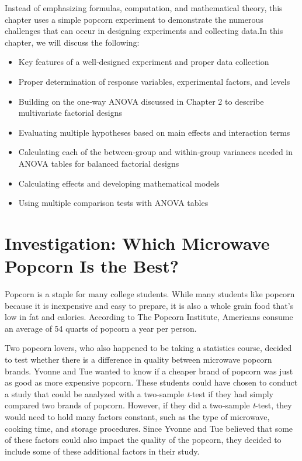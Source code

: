 \documentclass[
]{book}
\providecommand{\tightlist}{%
  \setlength{\itemsep}{0pt}\setlength{\parskip}{0pt}}
\begin{document}
Instead of emphasizing formulas, computation, and mathematical theory, this chapter uses a simple popcorn experiment to demonstrate the numerous challenges that can occur in designing experiments and collecting data.In this chapter, we will discuss the following:

\begin{itemize}
\tightlist
\item
  Key features of a well‑designed experiment and proper data collection
\item
  Proper determination of response variables, experimental factors, and levels\\
\item
  Building on the one‑way ANOVA discussed in Chapter 2 to describe multivariate factorial designs\\
\item
  Evaluating multiple hypotheses based on main effects and interaction terms\\
\item
  Calculating each of the between‑group and within‑group variances needed in ANOVA tables for balanced factorial designs\\
\item
  Calculating effects and developing mathematical models\\
\item
  Using multiple comparison tests with ANOVA tables
\end{itemize}

\newpage

\hypertarget{investigation-which-microwave-popcorn-is-the-best}{%
\section{Investigation: Which Microwave Popcorn Is the Best?}\label{investigation-which-microwave-popcorn-is-the-best}}

Popcorn is a staple for many college students. While many students like popcorn because it is inexpensive and easy to prepare, it is also a whole grain food that's low in fat and calories. According to The Popcorn Institute, Americans consume an average of 54 quarts of popcorn a year per person.

Two popcorn lovers, who also happened to be taking a statistics course, decided to test whether there is a difference in quality between microwave popcorn brands. Yvonne and Tue wanted to know if a cheaper brand of popcorn was just as good as more expensive popcorn. These students could have chosen to conduct a study that could be analyzed with a two‑sample \emph{t}‑test if they had simply compared two brands of popcorn. However, if they did a two‑sample \emph{t}‑test, they would need to hold many factors constant, such as the type of microwave, cooking time, and storage procedures. Since Yvonne and Tue believed that some of these factors could also impact the quality of the popcorn, they decided to include some of these additional factors in their study.
\end{document}
